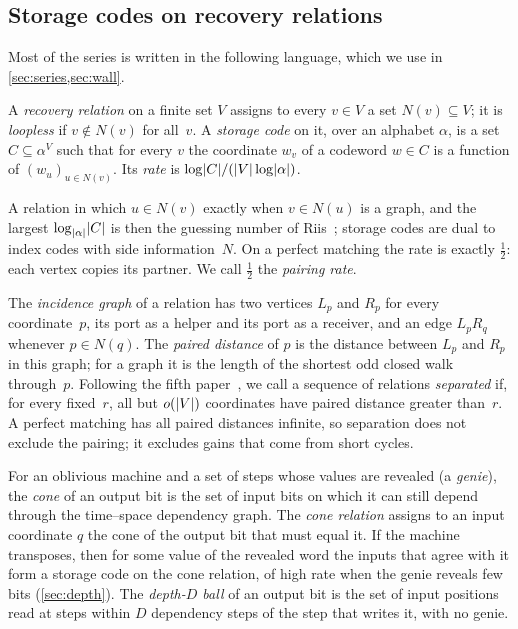 \subsection{Storage codes on recovery relations}\label{sec:storage}

Most of the series is written in the following language, which we use in \cref{sec:series,sec:wall}.

\begin{definition}\label{def:storage}
A \emph{recovery relation} on a finite set $V$ assigns to every $v\in V$ a set $N(v)\subseteq V$; it is
\emph{loopless} if $v\notin N(v)$ for all~$v$. A
\emph{storage code} on it, over an alphabet $\alpha$, is a set $C\subseteq\alpha^V$ such that for every $v$ the coordinate
$w_v$ of a codeword $w\in C$ is a function of $(w_u)_{u\in N(v)}$. Its \emph{rate} is $\log\lvert C \rvert/(\lvert V \rvert\log\lvert \alpha \rvert)$.
\end{definition}

A relation in which $u\in N(v)$ exactly when $v\in N(u)$ is a graph, and the largest $\log_{\lvert \alpha \rvert}\lvert C \rvert$ is then the
guessing number of Riis~\cite{Riis2007}; storage codes are dual to index codes with side information~$N$. On a perfect
matching the rate is exactly $\tfrac12$: each vertex copies its partner. We call $\tfrac12$ the \emph{pairing rate}.

The \emph{incidence graph} of a relation has two vertices $L_p$ and $R_p$ for every coordinate~$p$, its port as a
helper and its port as a receiver, and an edge $L_pR_q$ whenever $p\in N(q)$. The \emph{paired distance} of $p$ is the
distance between $L_p$ and $R_p$ in this graph; for a graph it is the length of the shortest odd closed walk through~$p$.
Following the fifth paper~\cite[Definition~2.3]{DirectedRecovery2026}, we call a sequence of relations \emph{separated}
if, for every fixed~$r$, all but $o(\lvert V \rvert)$ coordinates have paired distance greater than~$r$. A perfect matching has
all paired distances infinite, so separation does not exclude the pairing; it excludes gains that come from short
cycles.

For an oblivious machine and a set of steps whose values are revealed (a \emph{genie}), the \emph{cone} of an output
bit is the set of input bits on which it can still depend through the time--space dependency graph. The \emph{cone
relation} assigns to an input coordinate $q$ the cone of the output bit that must equal it. If the machine transposes,
then for some value of the revealed word the inputs that agree with it form a storage code on the cone relation, of
high rate when the genie reveals few bits (\cref{sec:depth}). The \emph{depth-$D$ ball} of an output bit is the set of
input positions read at steps within $D$ dependency steps of the step that writes it, with no genie.

